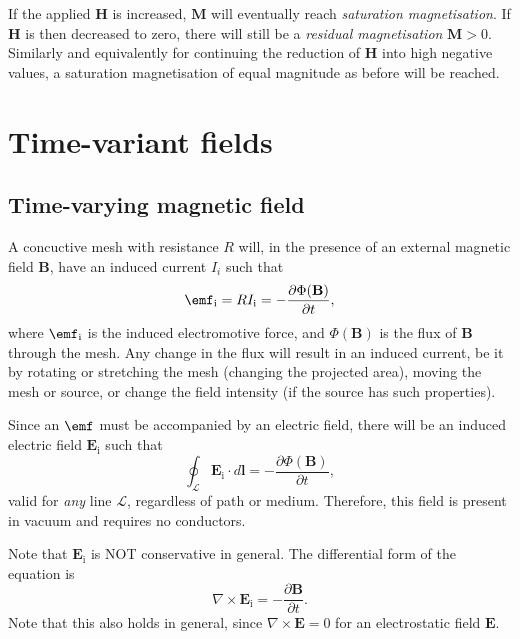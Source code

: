 \documentclass[a4paper, 12pt]{article}
\renewcommand{\vec}[1]{\mathbf{#1}}
\newcommand{\E}{\ensuremath{\vec{E}}}
\newcommand{\B}{\ensuremath{\vec{B}}}
\renewcommand{\H}{\ensuremath{\vec{H}}}
\begin{document}
            If the applied \H{} is increased, $\vec{M}$ will eventually reach \textit{saturation magnetisation}. 
            If \H{} is then decreased to zero, there will still be a \textit{residual magnetisation} $\vec{M} > 0$. 
            Similarly and equivalently for continuing the reduction of \H{} into high negative values, 
            a saturation magnetisation of equal magnitude as before will be reached.

        
\section{Time-variant fields}
    \subsection{Time-varying magnetic field}
        A concuctive mesh with resistance $R$ will, in the presence of an external magnetic field \B, 
        have an induced current $I_i$ such that
        \begin{equation}
            \emf_\text{i} = RI_\text{i} = -\frac{\partial \Phi(\B)}{\partial t},
        \end{equation}
        where $\emf_\text{i}$ is the induced electromotive force, and $\Phi(\B)$ is the flux of \B{} through the mesh. 
        Any change in the flux will result in an induced current, 
        be it by rotating or stretching the mesh (changing the projected area),
        moving the mesh or source, or change the field intensity (if the source has such properties).

        Since an $\emf$ must be accompanied by an electric field, 
        there will be an induced electric field $\E_\text{i}$ such that
        \begin{equation}
            \oint_\mathcal{L}\E_\text{i}\cdot d\vec{l} = -\frac{\partial \Phi(\B)}{\partial t},
        \end{equation}
        valid for \textit{any} line $\mathcal{L}$, regardless of path or medium. 
        Therefore, this field is present in vacuum and requires no conductors.

        Note that $\E_\text{i}$ is NOT conservative in general. The differential form of the equation is
        \begin{equation}
            \nabla \times \E_\text{i} = -\frac{\partial \B}{\partial t}.
        \end{equation}
        Note that this also holds in general, since $\nabla\times\E = 0$ for an electrostatic field \E.
    
\end{document}
